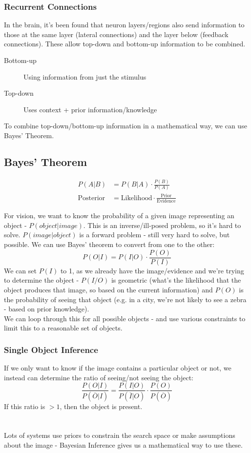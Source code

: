 \subsubsection{Recurrent Connections}
In the brain, it's been found that neuron layers/regions also send information to those at the same layer (lateral connections) and the layer below (feedback connections). These allow top-down and bottom-up information to be combined. 

\begin{description}
    \item[Bottom-up] Using information from just the stimulus
    \item[Top-down] Uses context + prior information/knowledge
\end{description}

To combine top-down/bottom-up information in a mathematical way, we can use Bayes' Theorem.

\subsection{Bayes' Theorem}
\begin{align}
    P(A|B) &= P(B|A)\cdot\frac{P(B)}{P(A)} \\
    \text{Posterior} &= \text{Likelihood} \cdot \frac{\text{Prior}}{\text{Evidence}} \nonumber
\end{align}

For vision, we want to know the probability of a given image representing an object - $P(object|image)$. This is an inverse/ill-posed problem, so it's hard to solve. $P(image|object)$ is a forward problem - still very hard to solve, but possible. We can use Bayes' theorem to convert from one to the other:
\begin{equation}
    P(O|I) = P(I|O)\cdot\frac{P(O)}{P(I)} 
\end{equation}
We can set $P(I)$ to 1, as we already have the image/evidence and we're trying to determine the object - $P(I/O)$ is geometric (what's the likelihood that the object produces that image, so based on the current information) and $P(O)$ is the probability of seeing that object (e.g. in a city, we're not likely to see a zebra - based on prior knowledge).\\
We can loop through this for all possible objects - and use various constraints to limit this to a reasonable set of objects.

\subsubsection{Single Object Inference}
If we only want to know if the image contains a particular object or not, we instead can determine the ratio of seeing/not seeing the object:
\begin{equation}
    \frac{P(O|I)}{P(\overline{O}|I)} = \frac{P(I|O)}{P(\overline{I}|O)}\cdot\frac{P(O)}{P(\overline{O})} 
\end{equation}
If this ratio is $>1$, then the object is present.\\ \\ \\

Lots of systems use priors to constrain the search space or make assumptions about the image - Bayesian Inference gives us a mathematical way to use these.
